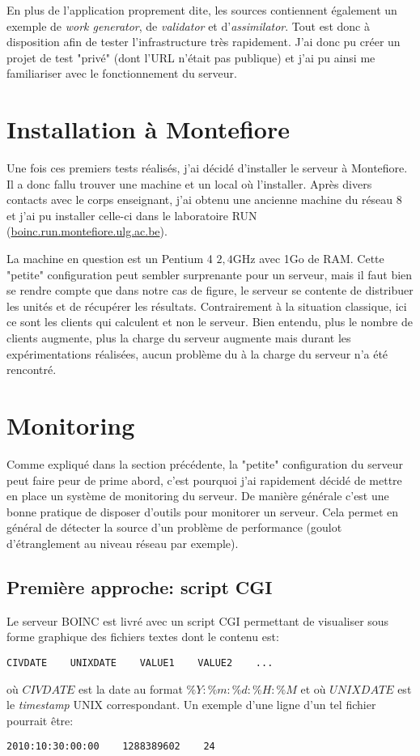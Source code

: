 \documentclass[a4paper, 11pt]{report}
\begin{document}
En plus de l'application proprement dite, les sources contiennent également un exemple de \textit{work generator}, de \textit{validator} et d'\textit{assimilator}. Tout est donc à disposition afin de tester l'infrastructure très rapidement. J'ai donc pu créer un projet de test "privé" (dont l'URL n'était pas publique) et j'ai pu ainsi me familiariser avec le fonctionnement du serveur.

\section{Installation à Montefiore}
Une fois ces premiers tests réalisés, j'ai décidé d'installer le serveur à Montefiore. Il a donc fallu trouver une machine et un local où l'installer. Après divers contacts avec le corps enseignant, j'ai obtenu une ancienne machine du réseau 8 et j'ai pu installer celle-ci dans le laboratoire RUN (\url{boinc.run.montefiore.ulg.ac.be}).

La machine en question est un Pentium 4 \@ $2,4$GHz avec 1Go de RAM. Cette "petite" configuration peut sembler surprenante pour un serveur, mais il faut bien se rendre compte que dans notre cas de figure, le serveur se contente de distribuer les unités et de récupérer les résultats. Contrairement à la situation classique, ici ce sont les clients qui calculent et non le serveur. Bien entendu, plus le nombre de clients augmente, plus la charge du serveur augmente mais durant les expérimentations réalisées, aucun problème du à la charge du serveur n'a été rencontré.

\section{Monitoring}
Comme expliqué dans la section précédente, la "petite" configuration du serveur peut faire peur de prime abord, c'est pourquoi j'ai rapidement décidé de mettre en place un système de monitoring du serveur. De manière générale c'est une bonne pratique de disposer d'outils pour monitorer un serveur. Cela permet en général de détecter la source d'un problème de performance (goulot d'étranglement au niveau réseau par exemple).

\subsection{Première approche: script CGI}
Le serveur \textsc{BOINC} est livré avec un script CGI permettant de visualiser sous forme graphique des fichiers textes dont le contenu est:
\begin{verbatim}
CIVDATE    UNIXDATE    VALUE1    VALUE2    ...
\end{verbatim}
où $CIVDATE$ est la date au format $\%Y:\%m:\%d:\%H:\%M$ et où $UNIXDATE$ est le \textit{timestamp} UNIX correspondant. Un exemple d'une ligne d'un tel fichier pourrait être:
\begin{verbatim}
2010:10:30:00:00    1288389602    24
\end{verbatim}
\end{document}
